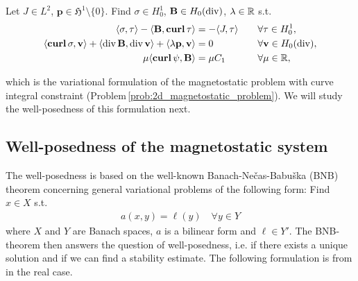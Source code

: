 \documentclass[../master_thesis.tex]{subfiles}
\begin{document}
\begin{problem}\label{prob:magnetostatic_problem_variational}
    Let $J \in L^2$, $\mathbf{p} \in \mathfrak{H}^1 \setminus \{0\}$. 
    Find $\sigma \in H^1_0$, $\mathbf{B} \in H_0(\diver)$, $\lambda \in \real$ s.t.
    \begin{align}
        \langle \sigma, \tau \rangle - \langle \mathbf{B}, \veccurl\tau \rangle 
        &=  -\langle J, \tau \rangle &&\quad \forall \tau \in H^1_0, \label{eq:first_eq_mixed_formulation_curve_integral}
        \\ \langle \veccurl\sigma, \mathbf{v} \rangle + \langle \diver \mathbf{B}, \diver \mathbf{v} \rangle 
        + \langle \lambda \mathbf{p}, \mathbf{v} \rangle 
        &= 0 &&\quad \forall \mathbf{v} \in H_0(\diver), \label{eq:second_eq_mixed_formulation_curve_integral}
        \\ \mu \langle \bm{\curl} \psi, \mathbf{B} \rangle &= \mu C_1 &&\quad \forall \mu \in \real,
    \end{align}
\end{problem}
\noindent which is the variational formulation of the magnetostatic problem with curve integral 
constraint (Problem\,\ref{prob:2d_magnetostatic_problem}). 
We will study the well-posedness of this formulation next. 

\subsection{Well-posedness of the magnetostatic system}\label{sec:well-posedness_of_magnetostatic_system}

The well-posedness is based on the well-known Banach-Nečas-Babuška (BNB) theorem 
concerning general variational problems of the following form: Find $x \in X$ 
s.t. 
\begin{align}
    a(x,y) = \ell(y) \quad \forall y \in Y \label{eq:general_variational_problem}
\end{align}
where $X$ and $Y$ are Banach spaces, $a$ is a bilinear form 
and $\ell \in Y'$. The BNB-theorem then answers the question of well-posedness, 
i.e. if there exists a unique solution and if we can find a stability estimate.
The following formulation is from \cite[Sec.\,25.3]{ern_guermond_2} in the real case.
\end{document}
